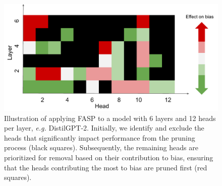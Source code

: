 \documentclass[letterpaper]{article} %
\begin{document}
\begin{figure}[h]
     \centering
    \centering
    \includegraphics[width=1\linewidth]{figures/AAAI_24_method_updated_4.pdf}
    \caption{Illustration of applying FASP {to a model with 6 layers and 12 heads per layer, \textit{e.g.} DistilGPT-2}. Initially, we identify and exclude the heads that significantly impact performance from the pruning process ({black squares}). Subsequently, the remaining heads are prioritized for removal based on their contribution to bias, ensuring that the heads contributing the most to bias are pruned first ({red squares}).%
    }
    \label{fig:head_pruning_1}
\end{figure}

\end{document}
